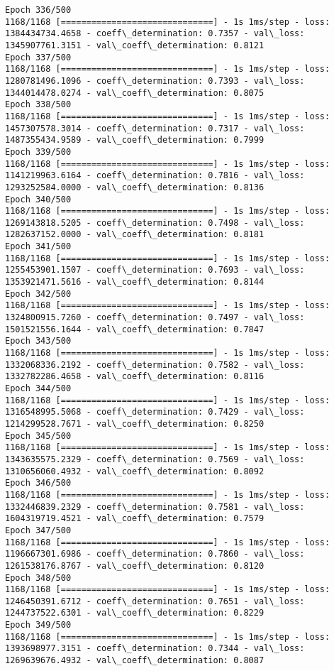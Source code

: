 \documentclass[11pt]{article}
\begin{document}
\begin{Verbatim}[commandchars=\\\{\}]
Epoch 336/500
1168/1168 [==============================] - 1s 1ms/step - loss: 1384434734.4658 - coeff\_determination: 0.7357 - val\_loss: 1345907761.3151 - val\_coeff\_determination: 0.8121
Epoch 337/500
1168/1168 [==============================] - 1s 1ms/step - loss: 1280781496.1096 - coeff\_determination: 0.7393 - val\_loss: 1344014478.0274 - val\_coeff\_determination: 0.8075
Epoch 338/500
1168/1168 [==============================] - 1s 1ms/step - loss: 1457307578.3014 - coeff\_determination: 0.7317 - val\_loss: 1487355434.9589 - val\_coeff\_determination: 0.7999
Epoch 339/500
1168/1168 [==============================] - 1s 1ms/step - loss: 1141219963.6164 - coeff\_determination: 0.7816 - val\_loss: 1293252584.0000 - val\_coeff\_determination: 0.8136
Epoch 340/500
1168/1168 [==============================] - 1s 1ms/step - loss: 1269143818.5205 - coeff\_determination: 0.7498 - val\_loss: 1282637152.0000 - val\_coeff\_determination: 0.8181
Epoch 341/500
1168/1168 [==============================] - 1s 1ms/step - loss: 1255453901.1507 - coeff\_determination: 0.7693 - val\_loss: 1353921471.5616 - val\_coeff\_determination: 0.8144
Epoch 342/500
1168/1168 [==============================] - 1s 1ms/step - loss: 1324800915.7260 - coeff\_determination: 0.7497 - val\_loss: 1501521556.1644 - val\_coeff\_determination: 0.7847
Epoch 343/500
1168/1168 [==============================] - 1s 1ms/step - loss: 1332068336.2192 - coeff\_determination: 0.7582 - val\_loss: 1332782286.4658 - val\_coeff\_determination: 0.8116
Epoch 344/500
1168/1168 [==============================] - 1s 1ms/step - loss: 1316548995.5068 - coeff\_determination: 0.7429 - val\_loss: 1214299528.7671 - val\_coeff\_determination: 0.8250
Epoch 345/500
1168/1168 [==============================] - 1s 1ms/step - loss: 1343635575.2329 - coeff\_determination: 0.7569 - val\_loss: 1310656060.4932 - val\_coeff\_determination: 0.8092
Epoch 346/500
1168/1168 [==============================] - 1s 1ms/step - loss: 1332446839.2329 - coeff\_determination: 0.7581 - val\_loss: 1604319719.4521 - val\_coeff\_determination: 0.7579
Epoch 347/500
1168/1168 [==============================] - 1s 1ms/step - loss: 1196667301.6986 - coeff\_determination: 0.7860 - val\_loss: 1261538176.8767 - val\_coeff\_determination: 0.8120
Epoch 348/500
1168/1168 [==============================] - 1s 1ms/step - loss: 1246450391.6712 - coeff\_determination: 0.7651 - val\_loss: 1244737522.6301 - val\_coeff\_determination: 0.8229
Epoch 349/500
1168/1168 [==============================] - 1s 1ms/step - loss: 1393698977.3151 - coeff\_determination: 0.7344 - val\_loss: 1269639676.4932 - val\_coeff\_determination: 0.8087

\end{Verbatim}
\end{document}
